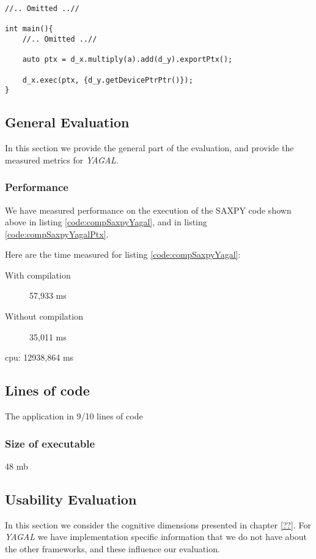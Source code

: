 \begin{lstlisting}[caption={\textit{YAGAL} \textit{SAXPY} utilizing \textit{PTX} generation.}, label={code:compSaxpyYagalPtx}]
//.. Omitted ..//

int main(){
    //.. Omitted ..//

    auto ptx = d_x.multiply(a).add(d_y).exportPtx();

    d_x.exec(ptx, {d_y.getDevicePtrPtr()});
}
\end{lstlisting}

\subsection{General Evaluation}
In this section we provide the general part of the evaluation, and provide the measured metrics for \textit{YAGAL}.

\subsubsection[*]{Performance}
We have measured performance on the execution of the SAXPY code shown above in listing \ref{code:compSaxpyYagal}, and in listing \ref{code:compSaxpyYagalPtx}.

Here are the time measured for listing \ref{code:compSaxpyYagal}:
\begin{description}
    \item[With compilation] 57,933 ms
    \item[Without compilation] 35,011 ms
\end{description}
cpu: 12938,864 ms

\subsection[*]{Lines of code}
The application in 
9/10 lines of code

\subsubsection[*]{Size of executable}
48 mb

\subsection{Usability Evaluation}
In this section we consider the cognitive dimensions presented in chapter \ref{??}. For \textit{YAGAL} we have implementation specific information that we do not have about the other frameworks, and these influence our evaluation.

